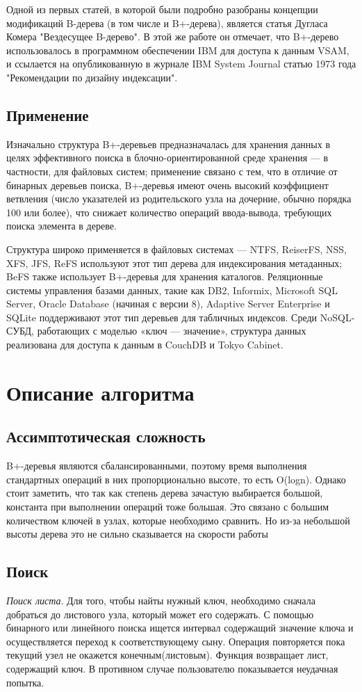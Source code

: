 \documentclass{article}
\begin{document}
Одной из первых статей, в которой были подробно разобраны концепции модификаций B-дерева (в том числе и B+-дерева), является статья Дугласа Комера "Вездесущее B-дерево". В этой же работе он отмечает, что B+-дерево использовалось в программном обеспечении IBM для доступа к данным VSAM, и ссылается на опубликованную в журнале IBM System Journal статью 1973 года "Рекомендации по дизайну индексации".

\subsection{Применение}
Изначально структура B+-деревьев предназначалась для хранения данных в целях эффективного поиска в блочно-ориентированной среде хранения — в частности, для файловых систем; применение связано с тем, что в отличие от бинарных деревьев поиска, B+-деревья имеют очень высокий коэффициент ветвления (число указателей из родительского узла на дочерние, обычно порядка 100 или более), что снижает количество операций ввода-вывода, требующих поиска элемента в дереве.

Структура широко применяется в файловых системах — NTFS, ReiserFS, NSS, XFS, JFS, ReFS используют этот тип дерева для индексирования метаданных; BeFS также использует B+-деревья для хранения каталогов. Реляционные системы управления базами данных, такие как DB2, Informix, Microsoft SQL Server, Oracle Database (начиная с версии 8), Adaptive Server Enterprise и SQLite поддерживают этот тип деревьев для табличных индексов. Среди NoSQL-СУБД, работающих с моделью «ключ — значение», структура данных реализована для доступа к данным в CouchDB и Tokyo Cabinet.

\section{Описание алгоритма}
\subsection{Ассимптотическая сложность}
B+-деревья являются сбалансированными, поэтому время выполнения стандартных операций в них пропорционально высоте, то есть O(logn). Однако стоит заметить, что так как степень дерева зачастую выбирается большой, константа при выполнении операций тоже большая. Это связано с большим количеством ключей в узлах, которые необходимо сравнить. Но из-за небольшой высоты дерева это не сильно сказывается на скорости работы

\subsection{Поиск}
\textit{Поиск листа}. Для того, чтобы найты нужный ключ, необходимо сначала добраться до листового узла, который может его содержать. С помощью бинарного или линейного поиска ищется интервал содержащий значение ключа и осуществляется переход к соответствующему сыну. Операция повторяется пока текущий узел не окажется конечным(листовым). Функция возвращает лист, содержащий ключ. В противном случае пользователю показывается неудачная попытка.
\end{document}
